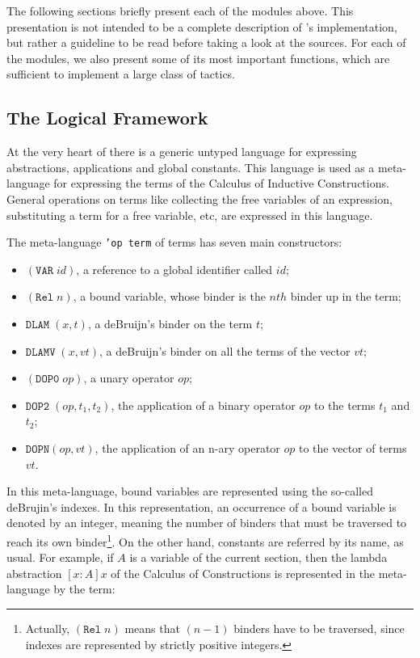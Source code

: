 \vspace{1em}

The following sections briefly present each of the modules above.
This presentation is not intended to be a complete description of \Coq's
implementation, but rather a guideline to be read before taking a look
at the sources. For each of the modules, we also present some of its
most important functions, which are sufficient to implement a large
class of tactics.


\subsection[The Logical Framework]{The Logical Framework\label{LogicalFramework}}

At the very heart of \Coq there is a generic untyped language for
expressing abstractions, applications and global constants. This
language is used as a meta-language for expressing the terms of the
Calculus of Inductive Constructions. General operations on terms like
collecting the free variables of an expression, substituting a term for
a free variable, etc, are expressed in this language.

The meta-language \texttt{'op term} of terms has seven main
constructors:
\begin{itemize}
\item $(\texttt{VAR}\;id)$, a reference to a global identifier called  $id$;
\item $(\texttt{Rel}\;n)$, a bound variable, whose binder is the $nth$
      binder up in the term;
\item $\texttt{DLAM}\;(x,t)$, a deBruijn's binder on the term $t$;
\item $\texttt{DLAMV}\;(x,vt)$, a deBruijn's binder on all the terms of 
      the vector $vt$;
\item $(\texttt{DOP0}\;op)$, a unary operator $op$;
\item $\texttt{DOP2}\;(op,t_1,t_2)$, the application of a binary
operator $op$ to the terms $t_1$ and $t_2$;
\item $\texttt{DOPN} (op,vt)$, the application of an n-ary operator $op$ to the
vector of terms $vt$.
\end{itemize}

In this meta-language, bound variables are represented using the
so-called deBrujin's indexes. In this representation, an occurrence of
a bound variable is denoted by an integer, meaning the number of
binders that must be traversed to reach its own
binder\footnote{Actually, $(\texttt{Rel}\;n)$ means that $(n-1)$ binders
have to be traversed, since indexes are represented by strictly
positive integers.}. On the other hand, constants are referred by its
name, as usual. For example, if $A$ is a variable of the current
section, then the lambda abstraction $[x:A]x$ of the Calculus of
Constructions is represented in the meta-language by the term:

